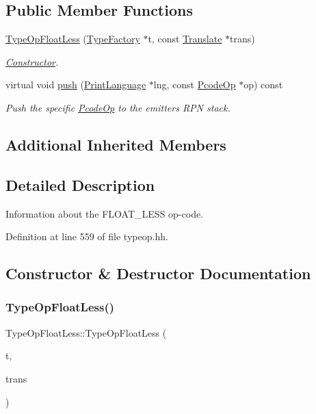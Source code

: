 \subsection*{Public Member Functions}
\begin{DoxyCompactItemize}
\item 
\mbox{\hyperlink{class_type_op_float_less_ac0110d757d9a0853faa4ff2e057a955a}{Type\+Op\+Float\+Less}} (\mbox{\hyperlink{class_type_factory}{Type\+Factory}} $\ast$t, const \mbox{\hyperlink{class_translate}{Translate}} $\ast$trans)
\begin{DoxyCompactList}\small\item\em \mbox{\hyperlink{class_constructor}{Constructor}}. \end{DoxyCompactList}\item 
virtual void \mbox{\hyperlink{class_type_op_float_less_a6d524f64314447c004973dc563adf2dc}{push}} (\mbox{\hyperlink{class_print_language}{Print\+Language}} $\ast$lng, const \mbox{\hyperlink{class_pcode_op}{Pcode\+Op}} $\ast$op) const
\begin{DoxyCompactList}\small\item\em Push the specific \mbox{\hyperlink{class_pcode_op}{Pcode\+Op}} to the emitter\textquotesingle{}s R\+PN stack. \end{DoxyCompactList}\end{DoxyCompactItemize}
\subsection*{Additional Inherited Members}


\subsection{Detailed Description}
Information about the F\+L\+O\+A\+T\+\_\+\+L\+E\+SS op-\/code. 

Definition at line 559 of file typeop.\+hh.



\subsection{Constructor \& Destructor Documentation}
\mbox{\label{class_type_op_float_less_ac0110d757d9a0853faa4ff2e057a955a}} 
\subsubsection{\texorpdfstring{TypeOpFloatLess()}{TypeOpFloatLess()}}
{\footnotesize\ttfamily Type\+Op\+Float\+Less\+::\+Type\+Op\+Float\+Less (\begin{DoxyParamCaption}\item[{\mbox{\hyperlink{class_type_factory}{Type\+Factory}} $\ast$}]{t,  }\item[{const \mbox{\hyperlink{class_translate}{Translate}} $\ast$}]{trans }\end{DoxyParamCaption})}



